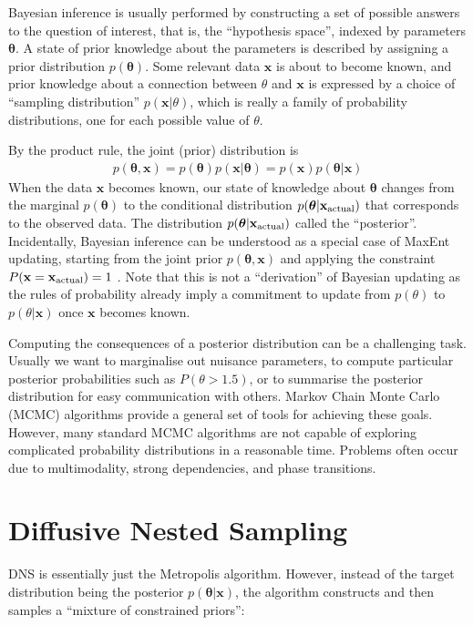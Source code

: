 \documentclass[
  ,final            %
  ]
  {aipproc}
\newcommand{\pars}{\boldsymbol{\theta}}
\newcommand{\data}{\mathbf{x}}
\begin{document}
Bayesian inference is usually performed by
constructing a set of possible answers to the question of
interest, that is, the ``hypothesis space'', indexed by parameters $\pars$.
A state of prior knowledge about the parameters is described by assigning a
prior distribution $p(\pars)$. Some relevant data $\data$ is about to become
known, and prior knowledge about a connection between $\theta$ and $\data$ is
expressed by a choice of ``sampling distribution'' $p(\data | \theta)$, which
is really a family of probability distributions, one for each possible value of
$\theta$.

By the product rule, the joint (prior) distribution is
\begin{eqnarray}
p(\pars, \data) = p(\pars) p(\data | \pars) = p(\data)p(\pars | \data)
\end{eqnarray}
When the
data $\data$ becomes known, our state of knowledge about $\pars$ changes
from the marginal $p(\pars)$ to the conditional distribution
$p(\pars | \data_{\rm actual})$
that corresponds to the observed data. The distribution
$p(\pars | \data_{\rm actual})$
called the ``posterior''.
Incidentally, Bayesian inference can be understood as a special case of
MaxEnt updating, starting from the joint prior $p(\pars, \data)$ and applying
the constraint $P(\data = \data_{\rm actual}) = 1$ \citep{caticha}. Note that
this is not a ``derivation'' of Bayesian updating as the rules of probability
already imply a commitment to update from $p(\theta)$ to $p(\theta | \data)$
once $\data$ becomes known.

Computing the consequences of a posterior distribution can be a challenging
task. Usually we want to marginalise out nuisance parameters, to compute
particular posterior probabilities such as $P(\theta > 1.5)$, or to summarise
the posterior distribution for easy communication with others.
Markov Chain Monte Carlo (MCMC) algorithms provide a general set of tools
for achieving these goals. However, many standard MCMC algorithms are not
capable of exploring complicated probability distributions in a reasonable time.
Problems often occur due to multimodality, strong dependencies, and phase
transitions.

\section{Diffusive Nested Sampling}
DNS is essentially just the Metropolis algorithm. However, instead of the
target distribution being the posterior $p(\pars|\data)$, the algorithm
constructs and then samples a ``mixture of constrained priors'':
\end{document}
